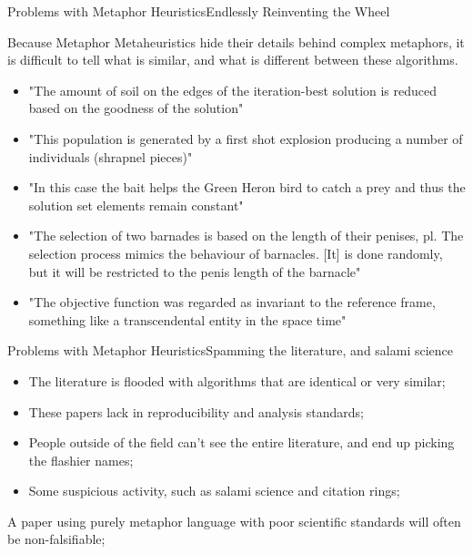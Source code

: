 \documentclass[aspectratio=169]{beamer}
\begin{document}
\begin{frame}{Problems with Metaphor Heuristics}{Endlessly Reinventing the Wheel}
  \begin{block}{}
  Because Metaphor Metaheuristics hide their details behind complex metaphors, it is difficult to tell what is similar, and what is different between these algorithms.\end{block}\bigskip

  \begin{itemize}
    \item "The amount of soil on the edges of the iteration-best solution is reduced based on the goodness of the solution"
    \item "This population is generated by a first shot explosion producing a number of individuals (shrapnel pieces)"
    \item "In this case the bait helps the Green Heron bird to catch a prey and thus the solution set elements remain constant"
    \item "The selection of two barnades is based on the length of their penises, pl. The selection process mimics the behaviour of barnacles. [It] is done randomly, but it will be restricted to the penis length of the barnacle"
    \item "The objective function was regarded as invariant to the reference frame, something like a transcendental entity in the space time"
  \end{itemize}
\end{frame}

\begin{frame}{Problems with Metaphor Heuristics}{Spamming the literature, and salami science}
  \begin{itemize}
    \item The literature is flooded with algorithms that are identical or very similar;
    \item These papers lack in reproducibility and analysis standards;
    \item People outside of the field can't see the entire literature, and end up picking the flashier names;
    \item Some suspicious activity, such as salami science and citation rings;
  \end{itemize}\bigskip

  \begin{block}{}
  A paper using purely metaphor language with poor scientific standards will often be non-falsifiable;
  \end{block}
\end{frame}
\end{document}
